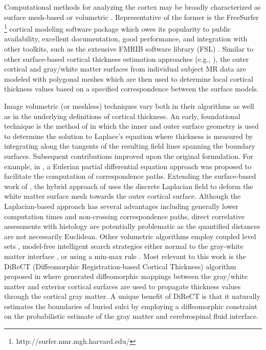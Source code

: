 Computational methods for analyzing the cortex may be 
broadly characterized as surface mesh-based or volumetric \citep{scott2009,clarkson2011}.  Representative of the former is the
FreeSurfer%
\footnote{
http://surfer.nmr.mgh.harvard.edu/
}
cortical modeling software package \citep{dale1999,fischl1999,fischl2000,fischl2002,fischl2004}
which owes its popularity to public availability, excellent documentation, 
good performance, and integration with other toolkits, such as the extensive FMRIB software 
library (FSL) \citep{smith2004}.  Similar to other surface-based cortical thickness estimation
approaches (e.g., \cite{davatzikos1996,magnotta1999,macdonald2000,kim2005}), the outer cortical
and gray/white matter surfaces from individual subject MR data are modeled with polygonal meshes
which are then used to determine local cortical thickness values based on a specified correspondence between 
the surface models.

Image volumetric (or meshless) techniques vary both in their algorithms as well as
in the underlying definitions of cortical thickness.  An early, foundational technique is the
method of \cite{jones2000} in which the inner and outer surface geometry is used to determine the
solution to Laplace's equation where thickness is measured by integrating along the 
tangents of the resulting field lines spanning the boundary surfaces.  Subsequent contributions
improved upon the original formulation.  For example, in \cite{yezzi2003}, a Eulerian partial differential equation approach
was proposed to facilitate the computation of correspondence paths.  Extending the surface-based
work of \cite{macdonald2000}, the hybrid approach of
\cite{kim2005} uses the discrete Laplacian field to deform the white matter surface mesh towards the 
outer cortical surface.    Although the Laplacian-based approach has several advantages
including generally lower computation times and
non-crossing correspondence paths, direct correlative assessments with histology
are potentially problematic as the quantified distances 
are not necessarily Euclidean.  Other volumetric algorithms employ coupled
level sets \citep{zeng1999}, model-free intelligent search strategies either normal to 
the gray-white matter interface \citep{scott2009}, or using a min-max rule \citep{clement-vachet2011}.
Most relevant to this work is the DiReCT (Diffeomorphic Registration-based 
Cortical Thickness) algorithm proposed in \cite{das2009} where generated
diffeomorphic mappings between the 
gray/white matter and exterior cortical surfaces are used to propagate thickness values
through the cortical gray matter.  A unique benefit of DiReCT is that it
naturally estimates the boundaries of buried sulci by employing a
diffeomorphic constraint on the probabilistic estimate of the gray
matter and cerebrospinal fluid interface.  

